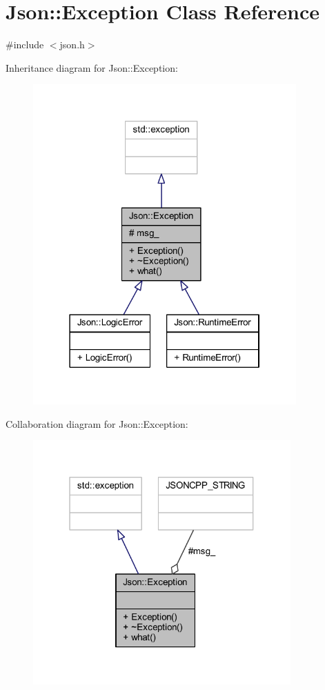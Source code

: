 \hypertarget{class_json_1_1_exception}{}\section{Json\+:\+:Exception Class Reference}
\label{class_json_1_1_exception}


{\ttfamily \#include $<$json.\+h$>$}



Inheritance diagram for Json\+:\+:Exception\+:\nopagebreak
\begin{figure}[H]
\begin{center}
\leavevmode
\includegraphics[width=286pt]{class_json_1_1_exception__inherit__graph}
\end{center}
\end{figure}


Collaboration diagram for Json\+:\+:Exception\+:\nopagebreak
\begin{figure}[H]
\begin{center}
\leavevmode
\includegraphics[width=280pt]{class_json_1_1_exception__coll__graph}
\end{center}
\end{figure}
